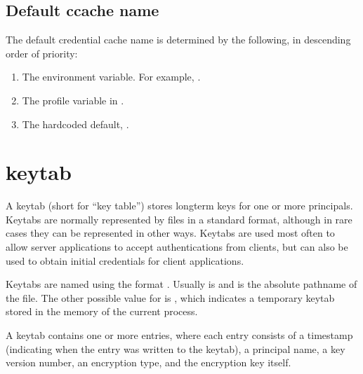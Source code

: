 \documentclass[letterpaper,10pt,english]{sphinxmanual}
\begin{document}
\section{Default ccache name}
\label{\detokenize{basic/ccache_def:default-ccache-name}}
\sphinxAtStartPar
The default credential cache name is determined by the following, in
descending order of priority:
\begin{enumerate}
%
\item {} 
\sphinxAtStartPar
The  environment variable.  For example,
.

\item {} 
\sphinxAtStartPar
The  profile variable in .

\item {} 
\sphinxAtStartPar
The hardcoded default, .

\end{enumerate}


\chapter{keytab}
\label{\detokenize{basic/keytab_def:keytab}}\label{\detokenize{basic/keytab_def:keytab-definition}}\label{\detokenize{basic/keytab_def::doc}}
\sphinxAtStartPar
A keytab (short for “key table”) stores long\sphinxhyphen{}term keys for one or more
principals.  Keytabs are normally represented by files in a standard
format, although in rare cases they can be represented in other ways.
Keytabs are used most often to allow server applications to accept
authentications from clients, but can also be used to obtain initial
credentials for client applications.

\sphinxAtStartPar
Keytabs are named using the format \sphinxcode{\sphinxupquote{:}}.  Usually
 is  and  is the absolute pathname of the file.
The other possible value for  is , which indicates a
temporary keytab stored in the memory of the current process.

\sphinxAtStartPar
A keytab contains one or more entries, where each entry consists of a
timestamp (indicating when the entry was written to the keytab), a
principal name, a key version number, an encryption type, and the
encryption key itself.
\end{document}
